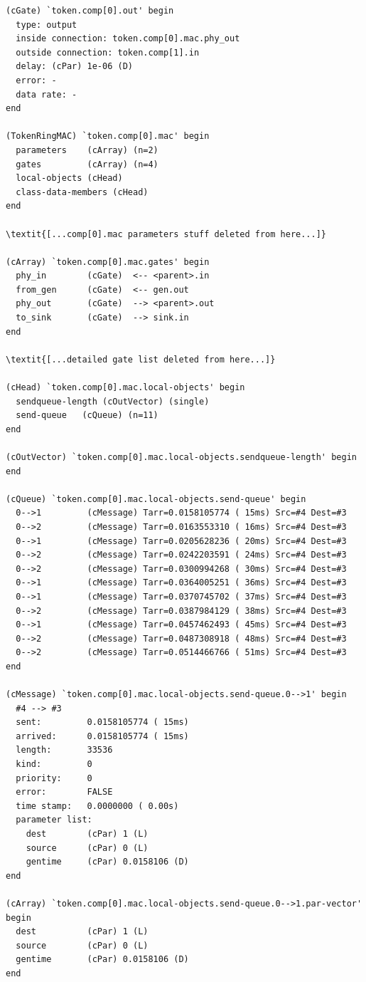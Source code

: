 \begin{Verbatim}[commandchars=\\\{\}]
(cGate) `token.comp[0].out' begin
  type: output
  inside connection: token.comp[0].mac.phy_out
  outside connection: token.comp[1].in
  delay: (cPar) 1e-06 (D)
  error: -
  data rate: -
end

(TokenRingMAC) `token.comp[0].mac' begin
  parameters    (cArray) (n=2)
  gates         (cArray) (n=4)
  local-objects (cHead)
  class-data-members (cHead)
end

\textit{[...comp[0].mac parameters stuff deleted from here...]}

(cArray) `token.comp[0].mac.gates' begin
  phy_in        (cGate)  <-- <parent>.in
  from_gen      (cGate)  <-- gen.out
  phy_out       (cGate)  --> <parent>.out
  to_sink       (cGate)  --> sink.in
end

\textit{[...detailed gate list deleted from here...]}

(cHead) `token.comp[0].mac.local-objects' begin
  sendqueue-length (cOutVector) (single)
  send-queue   (cQueue) (n=11)
end

(cOutVector) `token.comp[0].mac.local-objects.sendqueue-length' begin
end

(cQueue) `token.comp[0].mac.local-objects.send-queue' begin
  0-->1         (cMessage) Tarr=0.0158105774 ( 15ms) Src=#4 Dest=#3
  0-->2         (cMessage) Tarr=0.0163553310 ( 16ms) Src=#4 Dest=#3
  0-->1         (cMessage) Tarr=0.0205628236 ( 20ms) Src=#4 Dest=#3
  0-->2         (cMessage) Tarr=0.0242203591 ( 24ms) Src=#4 Dest=#3
  0-->2         (cMessage) Tarr=0.0300994268 ( 30ms) Src=#4 Dest=#3
  0-->1         (cMessage) Tarr=0.0364005251 ( 36ms) Src=#4 Dest=#3
  0-->1         (cMessage) Tarr=0.0370745702 ( 37ms) Src=#4 Dest=#3
  0-->2         (cMessage) Tarr=0.0387984129 ( 38ms) Src=#4 Dest=#3
  0-->1         (cMessage) Tarr=0.0457462493 ( 45ms) Src=#4 Dest=#3
  0-->2         (cMessage) Tarr=0.0487308918 ( 48ms) Src=#4 Dest=#3
  0-->2         (cMessage) Tarr=0.0514466766 ( 51ms) Src=#4 Dest=#3
end

(cMessage) `token.comp[0].mac.local-objects.send-queue.0-->1' begin
  #4 --> #3
  sent:         0.0158105774 ( 15ms)
  arrived:      0.0158105774 ( 15ms)
  length:       33536
  kind:         0
  priority:     0
  error:        FALSE
  time stamp:   0.0000000 ( 0.00s)
  parameter list:
    dest        (cPar) 1 (L)
    source      (cPar) 0 (L)
    gentime     (cPar) 0.0158106 (D)
end

(cArray) `token.comp[0].mac.local-objects.send-queue.0-->1.par-vector' begin
  dest          (cPar) 1 (L)
  source        (cPar) 0 (L)
  gentime       (cPar) 0.0158106 (D)
end


\end{Verbatim}
